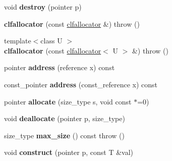 \begin{DoxyCompactItemize}
\item 
\hypertarget{structatl_1_1clfallocator_a98e3deb0f4af68706a8e0f1e273387bd}{void {\bfseries destroy} (pointer p)}\label{structatl_1_1clfallocator_a98e3deb0f4af68706a8e0f1e273387bd}

\item 
\hypertarget{structatl_1_1clfallocator_a8928d061c1c2a1dbab013e7326bb069b}{{\bfseries clfallocator} (const \hyperlink{structatl_1_1clfallocator}{clfallocator} \&)  throw ()}\label{structatl_1_1clfallocator_a8928d061c1c2a1dbab013e7326bb069b}

\item 
\hypertarget{structatl_1_1clfallocator_a1f5a58370ba67cf8a646bb86e445fc67}{{\footnotesize template$<$class U $>$ }\\{\bfseries clfallocator} (const \hyperlink{structatl_1_1clfallocator}{clfallocator}$<$ U $>$ \&)  throw ()}\label{structatl_1_1clfallocator_a1f5a58370ba67cf8a646bb86e445fc67}

\item 
\hypertarget{structatl_1_1clfallocator_a7a8b1f5f859ebc1cd1f8509ad681164c}{pointer {\bfseries address} (reference x) const }\label{structatl_1_1clfallocator_a7a8b1f5f859ebc1cd1f8509ad681164c}

\item 
\hypertarget{structatl_1_1clfallocator_a54cd719ba718b880e8a804b8734ab710}{const\+\_\+pointer {\bfseries address} (const\+\_\+reference x) const }\label{structatl_1_1clfallocator_a54cd719ba718b880e8a804b8734ab710}

\item 
\hypertarget{structatl_1_1clfallocator_aea65f52c1c20d0ebfcca437beb865a5d}{pointer {\bfseries allocate} (size\+\_\+type s, void const $\ast$=0)}\label{structatl_1_1clfallocator_aea65f52c1c20d0ebfcca437beb865a5d}

\item 
\hypertarget{structatl_1_1clfallocator_adbb84b7714c54c46cf34ca8046b444fc}{void {\bfseries deallocate} (pointer p, size\+\_\+type)}\label{structatl_1_1clfallocator_adbb84b7714c54c46cf34ca8046b444fc}

\item 
\hypertarget{structatl_1_1clfallocator_a01b57d577ebda86a68dea5d97efafff9}{size\+\_\+type {\bfseries max\+\_\+size} () const   throw ()}\label{structatl_1_1clfallocator_a01b57d577ebda86a68dea5d97efafff9}

\item 
\hypertarget{structatl_1_1clfallocator_af3fde57bd7401696b232dac995de70e2}{void {\bfseries construct} (pointer p, const T \&val)}\label{structatl_1_1clfallocator_af3fde57bd7401696b232dac995de70e2}


\end{DoxyCompactItemize}
